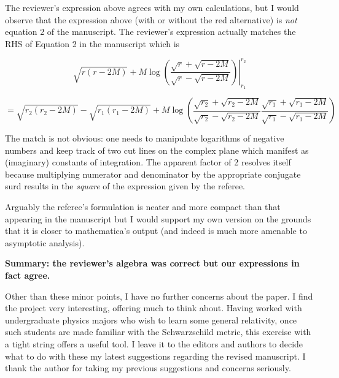 \documentclass[12pt]{article}
\begin{document}
{\color{blue} The reviewer's expression above agrees with my own
  calculations, but I would observe that the expression above (with or
  without the red alternative) is {\em not} equation 2 of the
  manuscript.  The reviewer's expression actually matches the RHS of
  Equation 2 in the manuscript which is

  \[
  \left.
  \sqrt{r(r-2M)} +M\log\left(
  \frac{\sqrt{r}+\sqrt{r-2M}}{\sqrt{r}-\sqrt{r-2M}}\right)
  \right|_{r_1}^{r_2}
  \]

  \[
  = 
  \sqrt{r_2(r_2-2M)}-  \sqrt{r_1(r_1-2M)}
 +M\log\left(
 \frac{\sqrt{r_2}+\sqrt{r_2-2M}}{\sqrt{r_2}-\sqrt{r_2-2M}}
 \frac{\sqrt{r_1}+\sqrt{r_1-2M}}{\sqrt{r_1}-\sqrt{r_1-2M}}
 \right)
  \]

The match is not obvious: one needs to manipulate logarithms of
negative numbers and keep track of two cut lines on the complex plane
which manifest as (imaginary) constants of integration.  The apparent
factor of 2 resolves itself because multiplying numerator and
denominator by the appropriate conjugate surd results in the {\em
  square} of the expression given by the referee.

Arguably the referee's formulation is neater and more compact than
that appearing in the manuscript but I would support my own version on
the grounds that it is closer to mathematica's output (and indeed is
much more amenable to asymptotic analysis).

{\bf Summary: the reviewer's algebra was correct but our expressions
  in fact agree.}
}

Other than these minor points, I have no further concerns about the
paper. I find the project very interesting, offering much to think
about. Having worked with undergraduate physics majors who wish to
learn some general relativity, once such students are made familiar
with the Schwarzschild metric, this exercise with a tight string
offers a useful tool. I leave it to the editors and authors to decide
what to do with these my latest suggestions regarding the revised
manuscript. I thank the author for taking my previous suggestions and
concerns seriously.
\end{document}
